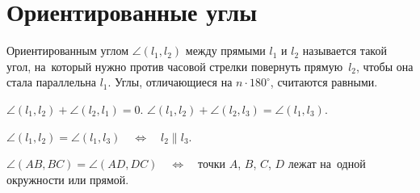 
\section*{Ориентированные углы}


Ориентированным углом $\angle (l_1, l_2)$ между прямыми $l_1$ и $l_2$
называется такой угол, на~который нужно против часовой стрелки повернуть
прямую~$l_2$, чтобы она стала параллельна $l_1$.
Углы, отличающиеся на $n \cdot 180^{\circ}$, считаются равными.

\setcounter{jeolmsubproblem}{0}
\par
\sp $\angle (l_1, l_2) + \angle (l_2, l_1) = 0$.
\qquad
\sp $\angle (l_1, l_2) + \angle (l_2, l_3) = \angle (l_1, l_3)$.
\par
\sp \(
    \angle (l_1, l_2) = \angle (l_1, l_3)
\quad\Longleftrightarrow\quad
    l_2 \parallel l_3
\).
\par
\sp \(
    \angle (AB, BC) = \angle (AD, DC)
\quad\Longleftrightarrow\quad
    \)точки $A$, $B$, $C$, $D$ лежат на~одной окружности или прямой.

